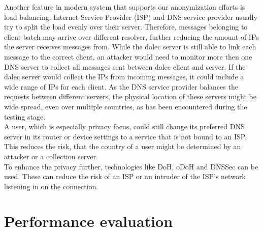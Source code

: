     Another feature in modern system that supports our anonymization efforts is load balancing. Internet Service Provider (ISP) and DNS service provider usually try to split the load evenly over their server. Therefore, messages belonging to client batch may arrive over different resolver, further reducing the amount of IPs the server receives messages from. While the dalec server is still able to link each message to the correct client, an attacker would need to monitor more then one DNS server to collect all messages sent between dalec client and server. If the dalec server would collect the IPs from incoming messages, it could include a wide range of IPs for each client. As the DNS service provider balances the requests between different servers, the physical location of these servers might be wide spread, even over multiple countries, as has been encountered during the testing stage.\\
    
    A user, which is especially privacy focus, could still change its preferred DNS server in its router or device settings to a service that is not bound to an ISP. This reduces the risk, that the country of a user might be determined by an attacker or a collection server.\\
    To enhance the privacy further, technologies like DoH, oDoH and DNSSec can be used. These can reduce the risk of an ISP or an intruder of the ISP's network listening in on the connection. 




\section{Performance evaluation}
\label{sec:results:telemetry}
%
    
